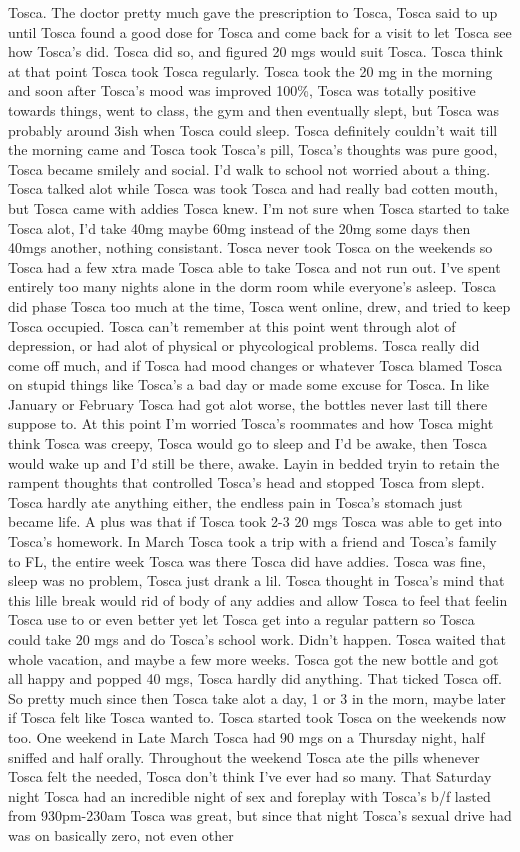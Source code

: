 \documentclass[12pt]{book}
\begin{document}
Tosca. The doctor pretty much gave the prescription to Tosca, Tosca said to up until Tosca found a good dose for Tosca and come back for a visit to let Tosca see how Tosca's did. Tosca did so, and figured 20 mgs would suit Tosca. Tosca think at that point Tosca took Tosca regularly. Tosca took the 20 mg in the morning and soon after Tosca's mood was improved 100\%, Tosca was totally positive towards things, went to class, the gym and then eventually slept, but Tosca was probably around 3ish when Tosca could sleep. Tosca definitely couldn't wait till the morning came and Tosca took Tosca's pill, Tosca's thoughts was pure good, Tosca became smilely and social. I'd walk to school not worried about a thing. Tosca talked alot while Tosca was took Tosca and had really bad cotten mouth, but Tosca came with addies Tosca knew. I'm not sure when Tosca started to take Tosca alot, I'd take 40mg maybe 60mg instead of the 20mg some days then 40mgs another, nothing consistant. Tosca never took Tosca on the weekends so Tosca had a few xtra made Tosca able to take Tosca and not run out. I've spent entirely too many nights alone in the dorm room while everyone's asleep. Tosca did phase Tosca too much at the time, Tosca went online, drew, and tried to keep Tosca occupied. Tosca can't remember at this point went through alot of depression, or had alot of physical or phycological problems. Tosca really did come off much, and if Tosca had mood changes or whatever Tosca blamed Tosca on stupid things like Tosca's a bad day or made some excuse for Tosca. In like January or February Tosca had got alot worse, the bottles never last till there suppose to. At this point I'm worried Tosca's roommates and how Tosca might think Tosca was creepy, Tosca would go to sleep and I'd be awake, then Tosca would wake up and I'd still be there, awake. Layin in bedded tryin to retain the rampent thoughts that controlled Tosca's head and stopped Tosca from slept. Tosca hardly ate anything either, the endless pain in Tosca's stomach just became life. A plus was that if Tosca took 2-3 20 mgs Tosca was able to get into Tosca's homework. In March Tosca took a trip with a friend and Tosca's family to FL, the entire week Tosca was there Tosca did have addies. Tosca was fine, sleep was no problem, Tosca just drank a lil. Tosca thought in Tosca's mind that this lille break would rid of body of any addies and allow Tosca to feel that feelin Tosca use to or even better yet let Tosca get into a regular pattern so Tosca could take 20 mgs and do Tosca's school work. Didn't happen. Tosca waited that whole vacation, and maybe a few more weeks. Tosca got the new bottle and got all happy and popped 40 mgs, Tosca hardly did anything. That ticked Tosca off. So pretty much since then Tosca take alot a day, 1 or 3 in the morn, maybe later if Tosca felt like Tosca wanted to. Tosca started took Tosca on the weekends now too. One weekend in Late March Tosca had 90 mgs on a Thursday night, half sniffed and half orally. Throughout the weekend Tosca ate the pills whenever Tosca felt the needed, Tosca don't think I've ever had so many. That Saturday night Tosca had an incredible night of sex and foreplay with Tosca's b/f lasted from 930pm-230am Tosca was great, but since that night Tosca's sexual drive had was on basically zero, not even other 
\end{document}

